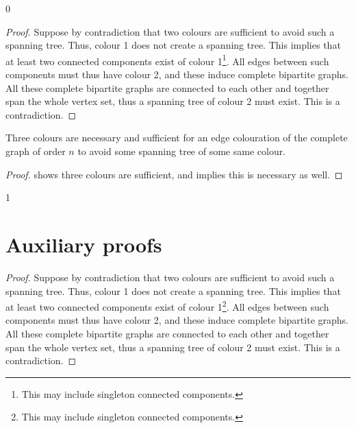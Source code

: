 \documentclass[a4paper,USenglish]{lipics-v2021}
\newcommand{\moveToAppendix}{1}
\begin{document}
\newcommand{\starTheoremTwoProof}{
\begin{proof}
	Suppose by contradiction that two colours are sufficient to avoid such a spanning tree.
	Thus, colour 1 does not create a spanning tree. This implies that at least two connected components exist of colour 1\footnote{This may include singleton connected components.}. All edges between such components must thus have colour 2, and these induce complete bipartite graphs. All these complete bipartite graphs are connected to each other and together span the whole vertex set, thus a spanning tree of colour 2 must exist. This is a contradiction.
\end{proof}
}\if\moveToAppendix0\starTheoremTwoProof\fi

\begin{corollary}
	Three colours are necessary and sufficient for an edge colouration of the complete graph of order $n$ to avoid some spanning tree of some same colour.
\end{corollary}

\begin{proof}
	 shows three colours are sufficient, and  implies this is necessary as well.
\end{proof}
	
\if\moveToAppendix1 
\newpage
\appendix	
\section{Auxiliary proofs}
\label{appendix:aux}

\starTheoremTwo*
\starTheoremTwoProof

\fi
		
\end{document}
